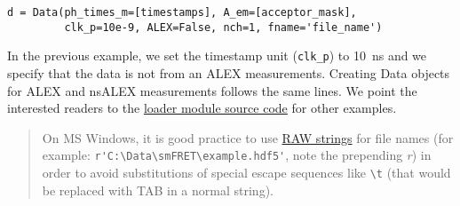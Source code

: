 \begin{verbatim}
d = Data(ph_times_m=[timestamps], A_em=[acceptor_mask], 
         clk_p=10e-9, ALEX=False, nch=1, fname='file_name')
\end{verbatim}

In the previous example, we set the timestamp unit (\verb|clk_p|) to 10~ns and we specify that the data is not from an ALEX measurements. Creating Data objects for ALEX and nsALEX measurements follows the same lines. We point the interested readers to the \href{https://github.com/tritemio/FRETBursts/blob/master/fretbursts/loader.py}{loader module source code} for other examples. 

\begin{quote}
On MS Windows, it is good practice to use \href{https://docs.python.org/2/tutorial/introduction.html#strings}{RAW strings} for file names (for example: \verb|r'C:\Data\smFRET\example.hdf5'|, note the prepending \textit{r}) in order to avoid substitutions of special escape sequences like \verb|\t| (that would be replaced with TAB in a normal string).
\end{quote}